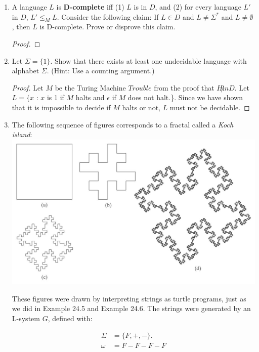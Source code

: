 \documentclass[10pt]{article}
\begin{document}
\begin{enumerate}[1)]

\item
A language $L$ is \textbf{D-complete} iff (1)  $L$ is in $D$, and (2) for every language  $L'$ in $D$,  $L' \leq _M L$.  Consider the following claim: If $L \in D$ and $L \neq \Sigma ^*$ and $L \neq \emptyset$, then $L$ is D-complete.  Prove or disprove this claim.
\begin{proof}[Proof]
\end{proof}


\item
Let $\Sigma = \{1\}$.  Show that there exists at least one undecidable language with alphabet $\Sigma$.   (Hint: Use a counting argument.)
\begin{proof}[Proof]
Let $M$ be the Turing Machine $Trouble$ from the proof that $H \not in D$.  Let $L = \{x$ : $x$ is 1 if $M$ halts and $\epsilon$ if $M$ does not halt.\}.  Since we have shown that it is impossible to decide if $M$ halts or not, $L$ must not be decidable.
\end{proof}

\pagebreak

\item
The following sequence of figures corresponds to a fractal called a \textit{Koch island}:\\

\includegraphics[scale=.4]{images/p8.png}

These figures were drawn by interpreting strings as turtle programs, just as we did in Example 24.5 and Example 24.6.  The strings were generated by an L-system $G$, defined with:

\begin{align*}
\Sigma &= \{F, +, -\}.\\
\omega &= F - F - F - F
\end{align*}


\end{enumerate}
\end{document}

